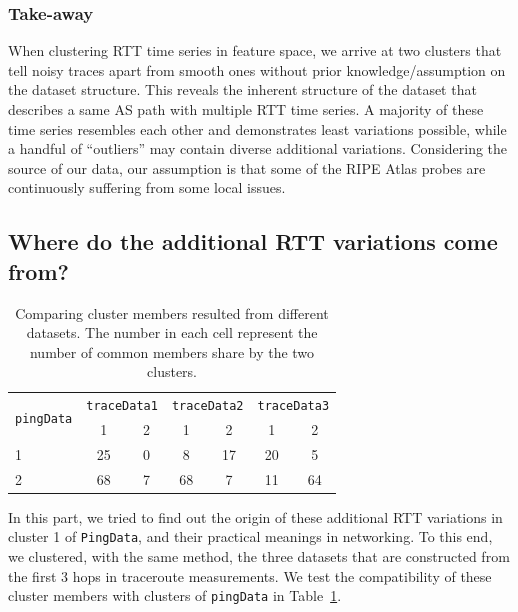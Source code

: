 \subsubsection*{Take-away}
When clustering RTT time series in feature space, we arrive at two clusters that tell noisy traces apart from smooth ones without prior knowledge/assumption on the dataset structure.
This reveals the inherent structure of the dataset that describes a same AS path with multiple RTT time series.
A majority of these time series resembles each other and demonstrates least variations possible, while a handful of ``outliers'' may contain diverse additional variations. 
Considering the source of our data, our assumption is that some of the RIPE Atlas probes are continuously suffering from some local issues.

\subsection{Where do the additional RTT variations come from?}

\begin{table}[!htb]
\centering
\footnotesize
\setlength{\tabcolsep}{0.5em}
\begin{tabular}{l|cc|cc|cc}
\toprule
\multirow{2}{*}{\texttt{pingData}} & \multicolumn{2}{c|}{\texttt{traceData1}} & \multicolumn{2}{c|}{\texttt{traceData2}} & \multicolumn{2}{c}{\texttt{traceData3}}\\
 &  1 & 2 & 1 & 2 & 1 & 2\\
\midrule
1 & 25 & 0 & 8 & 17 & 20 & 5 \\
2 & 68 & 7 & 68 & 7 & 11 & 64 \\
\bottomrule
\end{tabular}
\caption{Comparing cluster members resulted from different datasets. The number in each cell represent the number of common members share by the two clusters.}
\label{tab:comp_cls}
\end{table}

In this part, we tried to find out the origin of these additional RTT variations in cluster 1 of \texttt{PingData}, and their practical meanings in networking.
To this end, we clustered, with the same method, the three datasets that are constructed from the first 3 hops in traceroute measurements.
We test the compatibility of these cluster members with clusters of \texttt{pingData} in Table~\ref{tab:comp_cls}.


